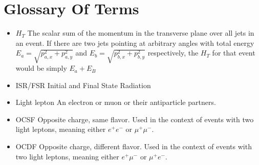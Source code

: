\chapter{Glossary Of Terms}

\begin{itemize}
\item{$H_T$} The scalar sum of the momentum in the transverse plane over all jets in an event. If there are two jets pointing at arbitrary angles with total energy $E_a=\sqrt{p_{a,x}^2 + p_{a,y}^2}$ and $E_b=\sqrt{p_{b,x}^2 + p_{b,y}^2}$ respectively, the $H_T$ for that event would be simply $E_a + E_B$

\item{ISR/FSR} Initial and Final State Radiation

\item{Light lepton} An electron or muon or their antiparticle partners.

\item{OCSF} Opposite charge, same flavor. Used in the context of events with two light leptons, meaning either $e^+e^-$ or $\mu^+ \mu^-$.

\item{OCDF} Opposite charge, different flavor. Used in the context of events with two light leptons, meaning either $e^+\mu^-$ or $\mu^+ e^-$.
\end{itemize}